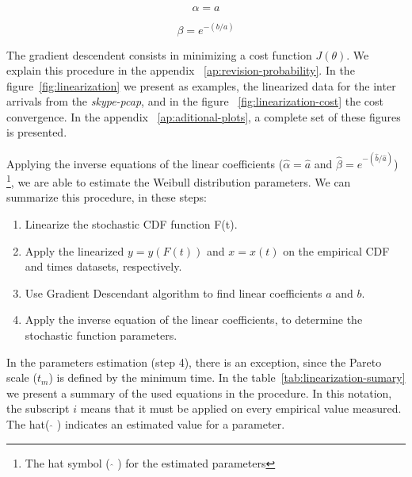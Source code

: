\begin{equation}
\alpha = a
\end{equation}

\begin{equation}
\beta = e^{-(b/a)}
\end{equation}

The gradient descendent consists in minimizing a cost function $J(\theta)$. We explain this procedure in the appendix ~\ref{ap:revision-probability}. In the figure~\ref{fig:linearization} we present as examples, the linearized data for the inter arrivals from the \textit{skype-pcap}, and in the figure ~\ref{fig:linearization-cost} the cost convergence. In the appendix ~\ref{ap:aditional-plots}, a complete set of these figures is presented.

Applying the inverse equations of the linear coefficients ($\hat{\alpha} = \hat{a}$ and $\hat{\beta} = e^{-(\hat{b}/\hat{a})}$) \footnote{The hat symbol ( $ \widehat{} $ ) for the estimated parameters}, we are able to estimate the Weibull distribution parameters. We can summarize this procedure, in these steps:
\begin{enumerate}
\item Linearize the stochastic CDF function F(t).
\item Apply the linearized $y = y(F(t))$ and  $x = x(t)$ on the empirical CDF and times datasets, respectively. 
\item Use Gradient Descendant algorithm to find linear coefficients $a$ and $b$.
\item Apply the inverse equation of the linear coefficients, to determine the stochastic function parameters.
\end{enumerate}

In the parameters estimation (step 4), there is an exception, since the Pareto scale ($t_{m}$) is defined by the minimum time. In the table~\ref{tab:linearization-sumary} we present a summary of the used equations in the procedure. In this notation, the subscript $i$ means that it must be applied on every empirical value measured. The hat( $\widehat{}$ ) indicates an estimated value for a parameter. 

